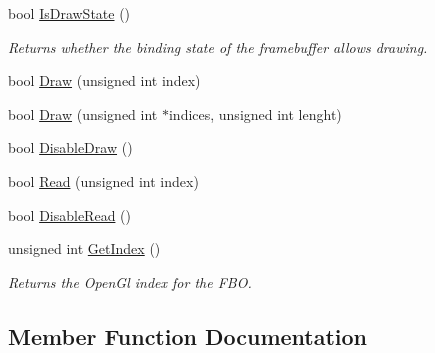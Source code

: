 \begin{DoxyCompactItemize}
bool \mbox{\hyperlink{class_geometry_engine_1_1_geometry_buffer_1_1_g_framebuffer_object_ae3a57669df01cf7303f2b07f1da07e50}{Is\+Draw\+State}} ()
\begin{DoxyCompactList}\small\item\em Returns whether the binding state of the framebuffer allows drawing. \end{DoxyCompactList}\item 
bool \mbox{\hyperlink{class_geometry_engine_1_1_geometry_buffer_1_1_g_framebuffer_object_a7d7a7a938f5889a79701d5dd7af17ca7}{Draw}} (unsigned int index)
\item 
bool \mbox{\hyperlink{class_geometry_engine_1_1_geometry_buffer_1_1_g_framebuffer_object_abb6147d96585c43a6c2d53fe2506a863}{Draw}} (unsigned int $\ast$indices, unsigned int lenght)
\item 
bool \mbox{\hyperlink{class_geometry_engine_1_1_geometry_buffer_1_1_g_framebuffer_object_a3eb30c7714c5c3f3c2ec8f85a2ec948c}{Disable\+Draw}} ()
\item 
bool \mbox{\hyperlink{class_geometry_engine_1_1_geometry_buffer_1_1_g_framebuffer_object_ac805af681fd2a966b9a73e10885ec4ad}{Read}} (unsigned int index)
\item 
bool \mbox{\hyperlink{class_geometry_engine_1_1_geometry_buffer_1_1_g_framebuffer_object_a916dea3e3d84f0c3126f853c91de64ed}{Disable\+Read}} ()
\item 
\mbox{\label{class_geometry_engine_1_1_geometry_buffer_1_1_g_framebuffer_object_ade8a74f649964b857379f46d2e6cc858}} 
unsigned int \mbox{\hyperlink{class_geometry_engine_1_1_geometry_buffer_1_1_g_framebuffer_object_ade8a74f649964b857379f46d2e6cc858}{Get\+Index}} ()
\begin{DoxyCompactList}\small\item\em Returns the Open\+Gl index for the F\+BO. \end{DoxyCompactList}\end{DoxyCompactItemize}


\subsection{Member Function Documentation}
\mbox{\label{class_geometry_engine_1_1_geometry_buffer_1_1_g_framebuffer_object_adfb75620d155c4af37683954df4eeb4d}} 
